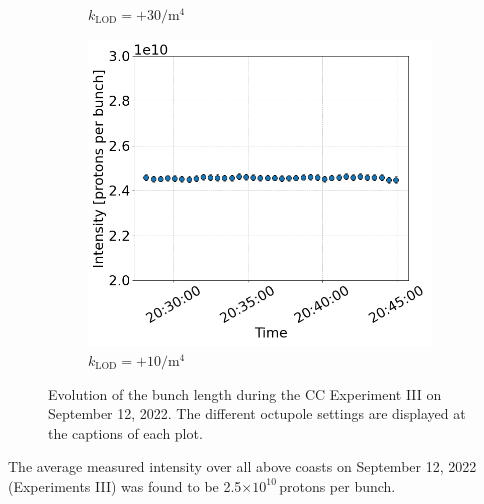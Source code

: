 \begin{figure}[htp]
\begin{subfigure}{.45\textwidth}
            \caption{$k_\mathrm{LOD}=+30 \mathrm{/m^{4}}$}
    \end{subfigure}
    \begin{subfigure}{.45\textwidth}
        \centering
        \includegraphics[width=.95\linewidth]{images/app_e/intensity_cc_md_12Sep22_coast_11.png}  
        \caption{$k_\mathrm{LOD}=+10  \mathrm{/m^{4}}$}
\end{subfigure}
    \caption{Evolution of the bunch length during the CC Experiment III on September 12, 2022. The different octupole settings are displayed at the captions of each plot.}
    \label{fig:cc_md_sep_2022_overview_plots_klod_scan_intensity}
 \end{figure}

 The average measured intensity over all above coasts on September 12, 2022 (Experiments III) was found to be 2.5$\times 10^{10}$\,protons per bunch. 